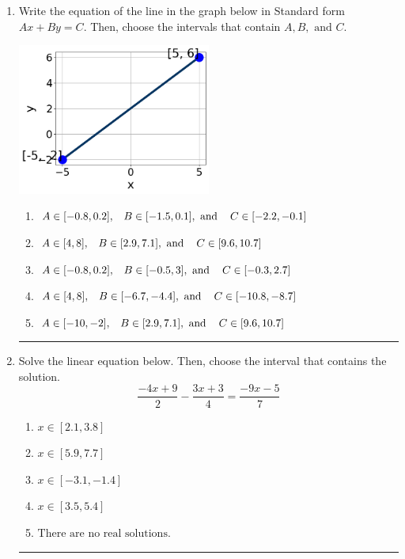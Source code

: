 \documentclass[14pt]{extbook}
\newcommand{\litem}[1]{\item#1\hspace*{-1cm}\rule{\textwidth}{0.4pt}}
\begin{document}
\begin{enumerate}
{\begin{enumerate}[label=\Alph*.]
\end{enumerate} }
\litem{
Write the equation of the line in the graph below in Standard form $Ax+By=C$. Then, choose the intervals that contain $A, B, \text{ and } C$.
\begin{center}
    \includegraphics[width=0.5\textwidth]{../Figures/linearGraphToStandardC.png}
\end{center}
\begin{enumerate}[label=\Alph*.]
\item \( A \in [-0.8, 0.2], \hspace{3mm} B \in [-1.5, 0.1], \text{ and } \hspace{3mm} C \in [-2.2, -0.1] \)
\item \( A \in [4, 8], \hspace{3mm} B \in [2.9, 7.1], \text{ and } \hspace{3mm} C \in [9.6, 10.7] \)
\item \( A \in [-0.8, 0.2], \hspace{3mm} B \in [-0.5, 3], \text{ and } \hspace{3mm} C \in [-0.3, 2.7] \)
\item \( A \in [4, 8], \hspace{3mm} B \in [-6.7, -4.4], \text{ and } \hspace{3mm} C \in [-10.8, -8.7] \)
\item \( A \in [-10, -2], \hspace{3mm} B \in [2.9, 7.1], \text{ and } \hspace{3mm} C \in [9.6, 10.7] \)

\end{enumerate} }
\litem{
Solve the linear equation below. Then, choose the interval that contains the solution.\[ \frac{-4x + 9}{2} - \frac{3x + 3}{4} = \frac{-9x -5}{7} \]\begin{enumerate}[label=\Alph*.]
\item \( x \in [2.1, 3.8] \)
\item \( x \in [5.9, 7.7] \)
\item \( x \in [-3.1, -1.4] \)
\item \( x \in [3.5, 5.4] \)
\item \( \text{There are no real solutions.} \)


\end{enumerate}}
\end{enumerate}
\end{document}
